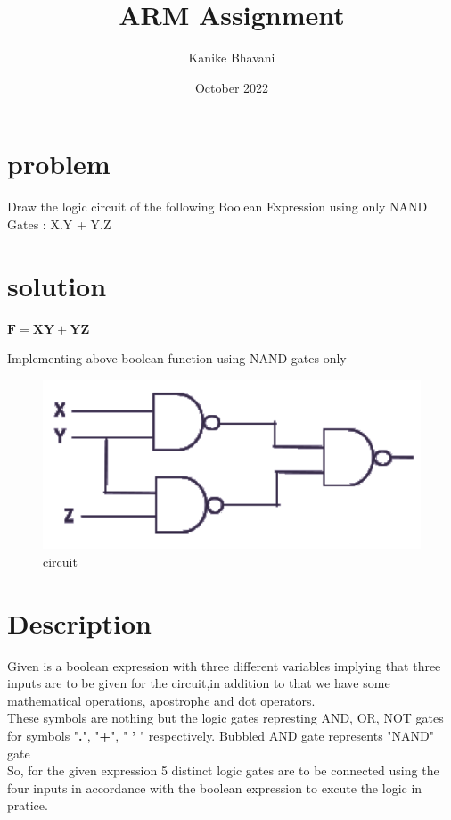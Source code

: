 \documentclass[10pt,twocolumn]{article}
\title{\textbf{ARM Assignment}}
\author{Kanike Bhavani}
\date{October 2022}
\begin{document}
\maketitle
\section*{problem}
 Draw the logic circuit of the following Boolean Expression
using only NAND Gates : X.Y + Y.Z

\section*{solution}
    \begin{center}
     ${\boldsymbol{F}=\boldsymbol{X}\boldsymbol{Y}+\boldsymbol{YZ}}$
    \end{center}
Implementing above boolean function using NAND gates only
\begin{figure}[h]
    \centering
    \includegraphics[scale=0.4]{a1.png}
     \caption{circuit}
      \label{fig:circuit}
\end{figure}

    
\section{Description}
\large
Given is a boolean expression with three different variables implying that three inputs are to be given for the circuit,in addition to that we have some mathematical operations, apostrophe and dot operators. \vspace{2mm} 
\\ These symbols are nothing but the logic gates
represting AND, OR, NOT gates for symbols "\textbf{.}", "\textbf{+}", " \textbf{'} " respectively. Bubbled AND gate represents "NAND" gate\vspace{2mm}
\\ So, for the given expression 5 distinct logic gates are to be connected using the four inputs in accordance with the boolean expression to excute the logic in pratice.
\end{document}
